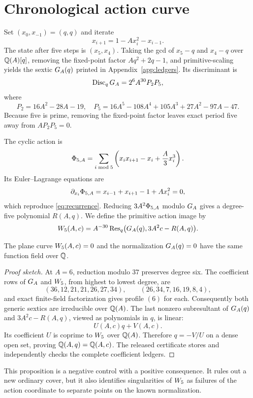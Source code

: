 \section{Chronological action curve}

Set \((x_0,x_{-1})=(q,q)\) and iterate
\begin{equation}
x_{i+1}=1-Ax_i^2-x_{i-1}.                                  \label{eq:recurrence}
\end{equation}
The state after five steps is \((x_5,x_4)\).  Taking the gcd of
\(x_5-q\) and \(x_4-q\) over \(\mathbb{Q}(A)[q]\), removing the fixed-point factor
\(Aq^2+2q-1\), and primitive-scaling yields the sextic \(G_A(q)\) printed
in Appendix~\ref{app:ledgers}.  Its discriminant is
\begin{equation}
\operatorname{Disc}_qG_A=2^6A^{30}P_2P_5,                                \label{eq:discG}
\end{equation}
where
\[
P_2=16A^2-28A-19,
\quad
P_5=16A^5-108A^4+105A^3+27A^2-97A-47.
\]
Because five is prime, removing the fixed-point factor leaves exact period
five away from \(AP_2P_5=0\).

The cyclic action is
\begin{equation}
\Phi_{5,A}=\sum_{i\bmod5}
\left(x_ix_{i+1}-x_i+\frac A3x_i^3\right).                 \label{eq:action}
\end{equation}
Its Euler--Lagrange equations are
\[
\partial_{x_i}\Phi_{5,A}=x_{i-1}+x_{i+1}-1+Ax_i^2=0,
\]
which reproduce \eqref{eq:recurrence}.  Reducing \(3A^2\Phi_{5,A}\) modulo
\(G_A\) gives a degree-five polynomial \(R(A,q)\).  We define the primitive
action image by
\begin{equation}
W_5(A,c)=A^{-30}\operatorname{Res}_q\bigl(G_A(q),3A^2c-R(A,q)\bigr).
                                                                    \label{eq:W}
\end{equation}

\begin{proposition}\label{prop:birational}
The plane curve \(W_5(A,c)=0\) and the normalization \(G_A(q)=0\) have the
same function field over \(\mathbb{Q}\).
\end{proposition}

\begin{proof}[Proof sketch]
At \(A=6\), reduction modulo \(37\) preserves degree six.  The coefficient
rows of \(G_A\) and \(W_5\), from highest to lowest degree, are
\[
(36,12,21,21,26,27,34),\qquad
(26,34,7,16,19,8,4),
\]
and exact finite-field factorization gives profile \((6)\) for each.
Consequently both generic sextics are irreducible over \(\mathbb{Q}(A)\).
The last nonzero subresultant of \(G_A(q)\) and \(3A^2c-R(A,q)\), viewed as
polynomials in \(q\), is linear:
\[
U(A,c)q+V(A,c).
\]
Its coefficient \(U\) is coprime to \(W_5\) over \(\mathbb{Q}(A)\).  Therefore
\(q=-V/U\) on a dense open set, proving
\(\mathbb{Q}(A,q)=\mathbb{Q}(A,c)\).  The released certificate stores and independently
checks the complete coefficient ledgers.
\end{proof}

This proposition is a negative control with a positive consequence.  It
rules out a new ordinary cover, but it also identifies singularities of
\(W_5\) as failures of the action coordinate to separate points on the
known normalization.
